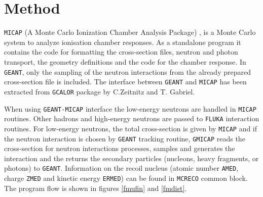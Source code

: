 \section{Method}
{\tt MICAP} (A Monte Carlo Ionization Chamber Analysis Package)
\cite{bib-MICA}, \cite{bib-MIC2} is a Monte Carlo
system to analyze ionisation chamber responses.
As a standalone program it contains the code for
formatting the cross-section files, neutron and photon
transport, the geometry definitions and the code for the
chamber response. In {\tt GEANT}, only the sampling
of the neutron interactions from the already prepared
cross-section file is included.
The interface between {\tt GEANT} and {\tt MICAP} has been extracted from
{\tt GCALOR} package\cite{bib-ZEIT} by C.Zeitnitz and T.
Gabriel. 

When using {\tt GEANT-MICAP} interface the low-energy
neutrons are handled in {\tt MICAP} routines. 
Other hadrons and high-energy neutrons are
passed to {\tt FLUKA} interaction routines.
For low-energy neutrons,
the total cross-section is given by {\tt MICAP}
and if the neutron interaction is chosen by {\tt GEANT}
tracking routine,
{\tt GMICAP} reads the cross-section for neutron interactions
processes,
samples and generates the interaction and the returns the
secondary particles (nucleons, heavy fragments, or
photons) to {\tt GEANT}. Information on the recoil
nucleus (atomic number {\tt AMED}, charge {\tt ZMED} and
kinetic energy {\tt ERMED}) can be found in {\tt MCRECO}
common block. The program flow is shown in figures
\ref{fmufin} and \ref{fmdist}.

